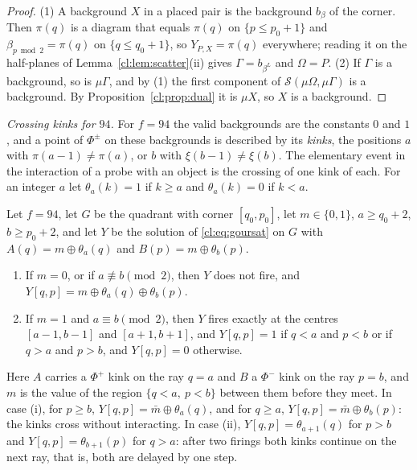 \begin{proof}
(1) A background $X$ in a placed pair is the background $b_\beta$ of the corner. Then $\pi(q)$ is a diagram that equals $\pi(q)$ on $\{p\le p_0+1\}$ and $\beta_{p\bmod2}=\pi(q)$ on $\{q\le q_0+1\}$, so $Y_{P,X}=\pi(q)$ everywhere; reading it on the half-planes of Lemma~\ref{cl:lem:scatter}(ii) gives $\Gamma=b_{\beta^L}$ and $\Omega=P$. (2) If $\Gamma$ is a background, so is $\mu\Gamma$, and by (1) the first component of $\mathcal S(\mu \Omega,\mu\Gamma)$ is a background. By Proposition~\ref{cl:prop:dual} it is $\mu X$, so $X$ is a background.
\end{proof}

\emph{Crossing kinks for $94$.} For $f=94$ the valid backgrounds are the constants $0$ and $1$, and a point of $\Phi^\pm$ on these backgrounds is described by its \emph{kinks}, the positions $a$ with $\pi(a-1)\ne\pi(a)$, or $b$ with $\xi(b-1)\ne\xi(b)$. The elementary event in the interaction of a probe with an object is the crossing of one kink of each. For an integer $a$ let $\theta_a(k)=1$ if $k\ge a$ and $\theta_a(k)=0$ if $k<a$.

\begin{lemma}\label{cl:lem:pair}
Let $f=94$, let $G$ be the quadrant with corner $[q_0,p_0]$, let $m\in\{0,1\}$, $a\ge q_0+2$, $b\ge p_0+2$, and let $Y$ be the solution of \eqref{cl:eq:goursat} on $G$ with $A(q)=m\oplus\theta_a(q)$ and $B(p)=m\oplus\theta_b(p)$.
\begin{enumerate}
\item[(i)] If $m=0$, or if $a\not\equiv b\pmod2$, then $Y$ does not fire, and $Y[q,p]=m\oplus\theta_a(q)\oplus\theta_b(p)$.
\item[(ii)] If $m=1$ and $a\equiv b\pmod2$, then $Y$ fires exactly at the centres $[a-1,b-1]$ and $[a+1,b+1]$, and $Y[q,p]=1$ if $q<a$ and $p<b$ or if $q>a$ and $p>b$, and $Y[q,p]=0$ otherwise.
\end{enumerate}
\end{lemma}

Here $A$ carries a $\Phi^+$ kink on the ray $q=a$ and $B$ a $\Phi^-$ kink on the ray $p=b$, and $m$ is the value of the region $\{q<a,\ p<b\}$ between them before they meet. In case (i), for $p\ge b$, $Y[q,p]=\bar m\oplus\theta_a(q)$, and for $q\ge a$, $Y[q,p]=\bar m\oplus\theta_b(p)$: the kinks cross without interacting. In case (ii), $Y[q,p]=\theta_{a+1}(q)$ for $p>b$ and $Y[q,p]=\theta_{b+1}(p)$ for $q>a$: after two firings both kinks continue on the next ray, that is, both are delayed by one step.

